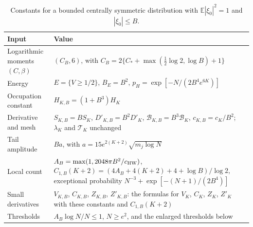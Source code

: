 \begin{table}[!ht]
\centering
\small
\begin{tabular}{@{}>{\raggedright\arraybackslash}p{}
>{\raggedright\arraybackslash}p{}@{}}
\toprule
Input & Value\\
\midrule
Logarithmic moments $(C,\beta)$ & $(C_B,6)$, with
 $C_B=2\{C_*+\max(\tfrac12\log2,\log B)+1\}$\\
Energy & $E=\{V\ge1/2\}$, $B_E=B^2$,
 $p_H=\exp[-N/(2B^4e^{6K})]$\\
Occupation constant & $H_{K,B}=(1+B^3)H_K$\\
Derivative and mesh & $S_{K,B}=BS_K$, $D'_{K,B}=B^2D'_K$,
 $\mathcal B_{K,B}=B^3\mathcal B_K$, $c_{K,B}=c_K/B^2$; $\lambda_K$ and
 $\mathcal T_K$ unchanged\\
Tail amplitude & $Ba$, with $a=15e^{2(K+2)}\sqrt{m_j\log N}$\\
Local count & $A_B=\max(1,2048\pi B^2/c_{\rm HW})$,
 $C_{1,B}(K+2)=(4A_B+4(K+2)+4+\log B)/\log2$,
 exceptional probability $N^{-3}+\exp[-(N+1)/(2B^4)]$\\
Small derivatives & $V_{K,B}$, $C_{K,B}$, $Z_{K,B}$, $Z'_{K,B}$: the
 formulas for $V_K$, $C_K$, $Z_K$, $Z'_K$ with these constants and
 $C_{1,B}(K+2)$\\
Thresholds & $A_B\log N/N\le1$, $N\ge e^2$, and the enlarged thresholds
 below\\
\bottomrule
\end{tabular}
\caption{Constants for a bounded centrally symmetric distribution with
$\mathbb E|\xi_0|^2=1$ and $|\xi_0|\le B$.}
\label{tab:law-bounded}
\end{table}

